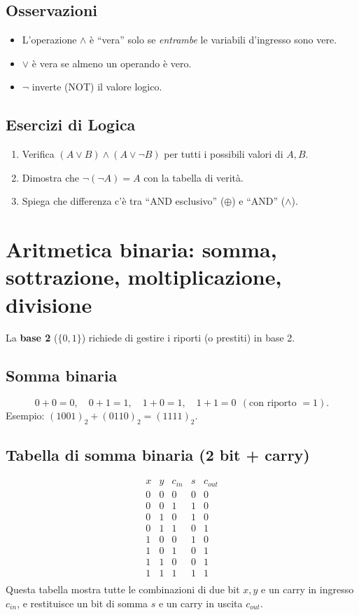 \documentclass[a4paper,12pt]{report}
\begin{document}
\subsection*{Osservazioni}
\begin{itemize}
    \item L’operazione \(\land\) è “vera” solo se \emph{entrambe} le variabili d’ingresso sono vere.
    \item \(\lor\) è vera se almeno un operando è vero.
    \item \(\lnot\) inverte (NOT) il valore logico.
\end{itemize}

\subsection*{Esercizi di Logica}
\begin{enumerate}
    \item Verifica \((A \lor B) \land (A \lor \lnot B)\) per tutti i possibili valori di \(A,B\).
    \item Dimostra che \(\lnot(\lnot A) = A\) con la tabella di verità.
    \item Spiega che differenza c’è tra “AND esclusivo” (\(\oplus\)) e “AND” (\(\land\)).
\end{enumerate}

\newpage
\section{Aritmetica binaria: somma, sottrazione, moltiplicazione, divisione}\label{sec:arit_bin}
La \textbf{base 2} (\(\{0,1\}\)) richiede di gestire i riporti (o prestiti) in base 2.

\subsection{Somma binaria}
\[
0 + 0 = 0,\quad
0 + 1 = 1,\quad
1 + 0 = 1,\quad
1 + 1 = 0 \ \ (\text{con riporto }=1).
\]
Esempio: \((1001)_2 + (0110)_2 = (1111)_2\).

\subsection{Tabella di somma binaria (2 bit + carry)}
\[
\begin{array}{c|c|c||c|c}
x & y & c_{in} & s & c_{out} \\
\hline
0 & 0 & 0 & 0 & 0 \\
0 & 0 & 1 & 1 & 0 \\
0 & 1 & 0 & 1 & 0 \\
0 & 1 & 1 & 0 & 1 \\
1 & 0 & 0 & 1 & 0 \\
1 & 0 & 1 & 0 & 1 \\
1 & 1 & 0 & 0 & 1 \\
1 & 1 & 1 & 1 & 1 \\
\end{array}
\]
Questa tabella mostra tutte le combinazioni di due bit \(x,y\) e un carry in ingresso \(c_{in}\), e restituisce un bit di somma \(s\) e un carry in uscita \(c_{out}\).
\end{document}
